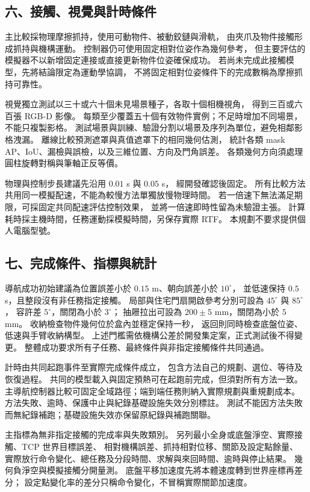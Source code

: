 \subsection*{六、接觸、視覺與計時條件}

主比較採物理摩擦抓持，使用可動物件、被動鉸鏈與滑軌，
由夾爪及物件接觸形成抓持與機構運動。
控制器仍可使用固定相對位姿作為幾何參考，
但主要評估的模擬器不以新增固定連接或直接更新物件位姿確保成功。
若尚未完成此接觸模型，先將結論限定為運動學協調，
不將固定相對位姿條件下的完成數稱為摩擦抓持可靠性。

視覺獨立測試以三十或六十個未見場景種子，各取十個相機視角，
得到三百或六百張 RGB-D 影像。
每類至少覆蓋五十個有效物件實例；不足時增加不同場景，不能只複製影格。
測試場景與訓練、驗證分割以場景及序列為單位，避免相鄰影格洩漏。
離線比較預測遮罩與真值遮罩下的相同幾何估測，
統計各類 mask AP、IoU、漏檢與誤檢，以及三維位置、方向及門角誤差。
各類幾何方向須處理圓柱旋轉對稱與筆軸正反等價。

物理與控制步長建議先沿用 $0.01$ s 與 $0.05$ s，
經開發確認後固定。
所有比較方法共用同一模擬配速，不能為較慢方法單獨放慢物理時間。
若一倍速下無法滿足期限，可採固定共同配速評估控制效果，
並將一倍速即時性留為未驗證主張。
計算耗時採主機時間，任務運動採模擬時間，另保存實際 RTF。
本規劃不要求提供個人電腦型號。

\subsection*{七、完成條件、指標與統計}

導航成功初始建議為位置誤差小於 $0.15$ m、朝向誤差小於 $10^\circ$，
並低速保持 $0.5$ s，且整段沒有非任務指定接觸。
局部與住宅門扇開啟參考分別可設為 $45^\circ$ 與 $85^\circ$，
容許差 $5^\circ$，關閉為小於 $3^\circ$；
抽屜拉出可設為 $200\pm5$ mm，關閉為小於 $5$ mm。
收納檢查物件幾何位於盒內並穩定保持一秒，
返回則同時檢查底盤位姿、低速與手臂收納構型。
上述門檻需依機構公差於開發集定案，正式測試後不得變更。
整體成功要求所有子任務、最終條件與非指定接觸條件共同通過。

計時由共同起跑事件至實際完成條件成立，
包含方法自己的規劃、選位、等待及恢復過程。
共同的模型載入與固定預熱可在起跑前完成，但須對所有方法一致。
主導航控制器比較可固定全域路徑；端到端任務則納入實際規劃與重規劃成本。
方法失敗、逾時、保護中止與紀錄基礎設施失效分別標註。
測試不能因方法失敗而無紀錄補跑；基礎設施失效亦保留原紀錄與補跑關聯。

主指標為無非指定接觸的完成率與失敗類別。
另列最小全身或底盤淨空、實際接觸、TCP 世界目標誤差、
相對機構誤差、抓持相對位移、關節及設定點餘量、
實際放行命令變化、總任務及分段時間、求解與來回時間、逾時與停止結果。
幾何負淨空與模擬接觸分開量測。
底盤平移加速度先將本體速度轉到世界座標再差分；
設定點變化率的差分只稱命令變化，不冒稱實際關節加速度。

